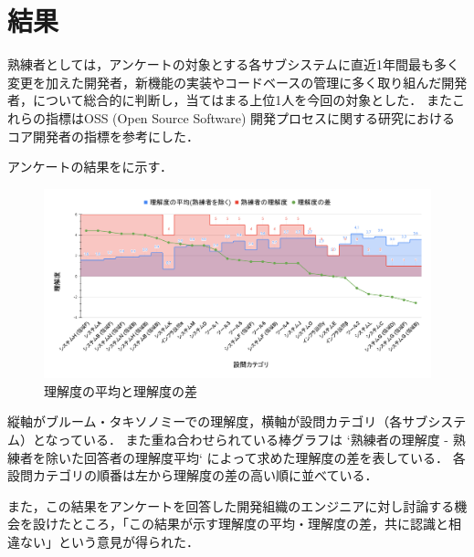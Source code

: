 \section{結果}
熟練者としては，アンケートの対象とする各サブシステムに直近1年間最も多く変更を加えた開発者，新機能の実装やコードベースの管理に多く取り組んだ開発者，について総合的に判断し，当てはまる上位1人を今回の対象とした．
またこれらの指標はOSS (Open Source Software) 開発プロセスに関する研究\cite{bib:mockus}におけるコア開発者の指標を参考にした．

アンケートの結果をに示す．

\begin{figure}[h]
	\centering
	\includegraphics[keepaspectratio,width=0.9\linewidth]{img/rikai.png}
	\caption{理解度の平均と理解度の差}
	\label{img:rikai}
\end{figure}

縦軸がブルーム・タキソノミーでの理解度，横軸が設問カテゴリ（各サブシステム）となっている．
また重ね合わせられている棒グラフは `熟練者の理解度 - 熟練者を除いた回答者の理解度平均` によって求めた理解度の差を表している．
各設問カテゴリの順番は左から理解度の差の高い順に並べている．

また，この結果をアンケートを回答した開発組織のエンジニアに対し討論する機会を設けたところ，「この結果が示す理解度の平均・理解度の差，共に認識と相違ない」という意見が得られた．
